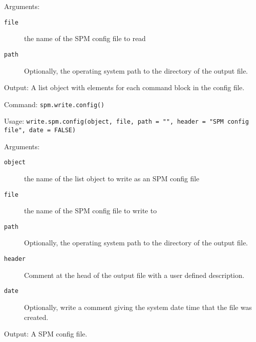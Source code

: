 Arguments:
\begin{description}
\item[\texttt{file}] the name of the SPM config file to read
\item[\texttt{path}] Optionally, the operating system path to the directory of the output file.
\end{description}

Output: A list object with elements for each command block in the config file.

Command: \texttt{spm.write.config()} 

Usage: \texttt{write.spm.config(object, file, path = "", header = "SPM config file", date = FALSE)}

Arguments:
\begin{description}
\item[\texttt{object}] the name of the list object to write as an SPM config file
\item[\texttt{file}] the name of the SPM config file to write to
\item[\texttt{path}] Optionally, the operating system path to the directory of the output file.
\item[\texttt{header}] Comment at the head of the output file with a user defined description.
\item[\texttt{date}] Optionally, write a comment giving the system date time that the file was created.

\end{description}

Output: A SPM config file.
